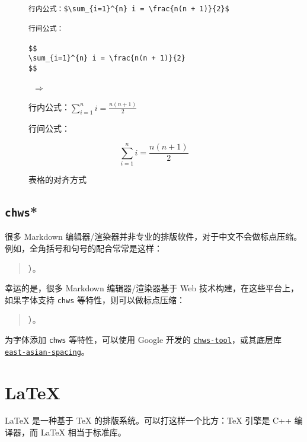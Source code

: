 \documentclass[a4paper,fontset=none]{ctexart}
\begin{document}
\begin{figure}[H]
    \centering
    \begin{minipage}{0.45\textwidth}
        \begin{verbatim}
行内公式：$\sum_{i=1}^{n} i = \frac{n(n + 1)}{2}$

行间公式：

$$
\sum_{i=1}^{n} i = \frac{n(n + 1)}{2}
$$
        \end{verbatim}
    \end{minipage}
    \, $\Longrightarrow$ \,
    \begin{minipage}{0.45\textwidth}
\begin{markdown}
行内公式：$\sum_{i=1}^{n} i = \frac{n(n + 1)}{2}$

行间公式：

$$
\sum_{i=1}^{n} i = \frac{n(n + 1)}{2}
$$
\end{markdown}
    \end{minipage}
    \caption{表格的对齐方式}
\end{figure}

\subsection{\texttt{chws}*}

很多 Markdown 编辑器/渲染器并非专业的排版软件，对于中文不会做标点压缩。例如，全角括号和句号的配合常常是这样：

\begin{quotation}
    ）\null 。
\end{quotation}

幸运的是，很多 Markdown 编辑器/渲染器基于 Web 技术构建，在这些平台上，如果字体支持 \verb|chws| 等特性，则可以做标点压缩：

\begin{quotation}
    ）。
\end{quotation}

为字体添加 \verb|chws| 等特性，可以使用 Google 开发的 \href{https://github.com/googlefonts/chws_tool}{\texttt{chws-tool}}，或其底层库 \href{https://github.com/kojiishi/east_asian_spacing}{\texttt{east-asian-spacing}}。

\section{\LaTeX}

LaTeX 是一种基于 TeX 的排版系统。可以打这样一个比方：TeX 引擎是 C++ 编译器，而 LaTeX 相当于标准库。
\end{document}
